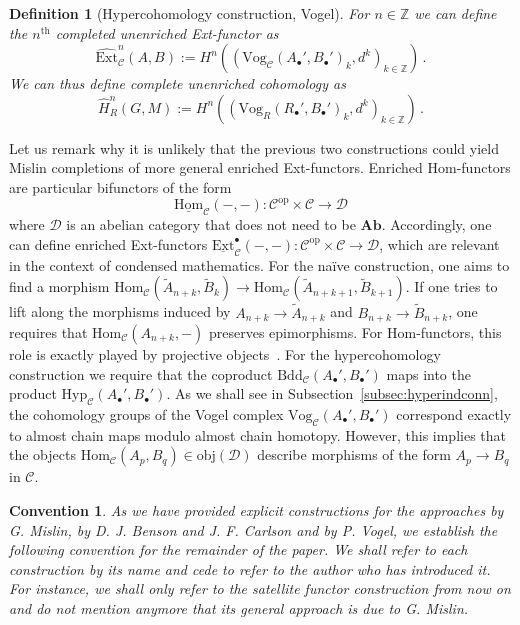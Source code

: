 \documentclass[12pt,a4paper]{article}
\numberwithin{equation}{section}
\newtheorem{defn}[thm]{Definition}
\newtheorem{conv}[thm]{Convention}
\theoremstyle{nonumberplain}
\begin{document}
\begin{defn}[Hypercohomology construction, Vogel]\label{defn:vogel}
For $n \in \mathbb{Z}$ we can define the $n^{\text{th}}$ completed unenriched Ext-functor as
\[ \widehat{\mathrm{Ext}}_{\mathcal{C}}^n(A, B) := H^n((\mathrm{Vog}_{\mathcal{C}}(A_{\bullet}', B_{\bullet}')_k, d^k)_{k \in \mathbb{Z}}) \, . \]
We can thus define complete unenriched cohomology as
\[ \widehat{H}_R^n(G, M) := H^n((\mathrm{Vog}_R(R_{\bullet}', B_{\bullet}')_k, d^k)_{k \in \mathbb{Z}})\, . \]
\end{defn}

Let us remark why it is unlikely that the previous two constructions could yield Mislin completions of more general enriched Ext-functors. Enriched Hom-functors are particular bifunctors of the form
\[ \underline{\mathrm{Hom}}_{\mathcal{C}}(-, -): \mathcal{C}^{\mathrm{op}} \times \mathcal{C} \rightarrow \mathcal{D} \]
where $\mathcal{D}$ is an abelian category that does not need to be $\mathbf{Ab}$. Accordingly, one can define enriched Ext-functors $\underline{\mathrm{Ext}}_{\mathcal{C}}^{\bullet}(-, -): \mathcal{C}^{\mathrm{op}} \times \mathcal{C} \rightarrow \mathcal{D}$, which are relevant in the context of condensed mathematics. For the naïve construction, one aims to find a morphism $\mathrm{Hom}_{\mathcal{C}}(\widetilde{A}_{n+k}, \widetilde{B}_k) \rightarrow \mathrm{Hom}_{\mathcal{C}}(\widetilde{A}_{n+k+1}, \widetilde{B}_{k+1})$. If one tries to lift along the morphisms induced by $A_{n+k} \rightarrow \widetilde{A}_{n+k}$ and $B_{n+k} \rightarrow \widetilde{B}_{n+k}$, one requires that $\mathrm{Hom}_{\mathcal{C}}(A_{n+k}, -)$ preserves epimorphisms. For Hom-functors, this role is exactly played by projective objects~\cite[Lemma~2.2.3]{wei94}. For the hypercohomology construction we require that the coproduct $\mathrm{Bdd}_{\mathcal{C}}(A_{\bullet}', B_{\bullet}')$ maps into the product $\mathrm{Hyp}_{\mathcal{C}}(A_{\bullet}', B_{\bullet}')$. As we shall see in Subsection~\ref{subsec:hyperindconn}, the cohomology groups of the Vogel complex $\mathrm{Vog}_{\mathcal{C}}(A_{\bullet}', B_{\bullet}')$ correspond exactly to almost chain maps modulo almost chain homotopy. However, this implies that the objects $\mathrm{Hom}_{\mathcal{C}}(A_p, B_q) \in \mathrm{obj}(\mathcal{D})$ describe morphisms of the form $A_p \rightarrow B_q$ in $\mathcal{C}$.

\begin{conv}
As we have provided explicit constructions for the approaches by G.\! Mislin, by D.\! J.\! Benson and J.\! F.\! Carlson and by P.\! Vogel, we establish the following convention for the remainder of the paper. We shall refer to each construction by its name and cede to refer to the author who has introduced it. For instance, we shall only refer to the satellite functor construction from now on and do not mention anymore that its general approach is due to G.\! Mislin. 
\end{conv}
\end{document}
